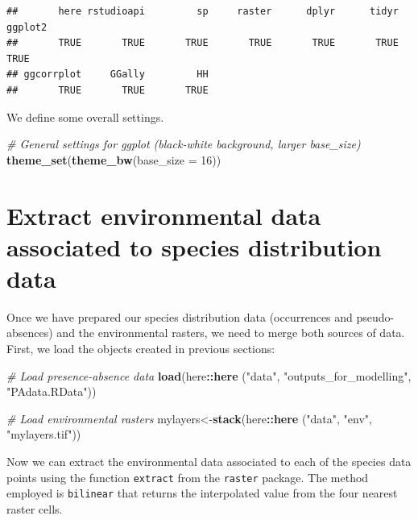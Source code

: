 \documentclass[
]{book}
\newenvironment{Shaded}{\begin{snugshade}}{\end{snugshade}}
\newcommand{\AttributeTok}[1]{\textcolor[rgb]{0.13,0.29,0.53}{#1}}
\newcommand{\CommentTok}[1]{\textcolor[rgb]{0.56,0.35,0.01}{\textit{#1}}}
\newcommand{\DecValTok}[1]{\textcolor[rgb]{0.00,0.00,0.81}{#1}}
\newcommand{\FunctionTok}[1]{\textcolor[rgb]{0.13,0.29,0.53}{\textbf{#1}}}
\newcommand{\NormalTok}[1]{#1}
\newcommand{\OtherTok}[1]{\textcolor[rgb]{0.56,0.35,0.01}{#1}}
\newcommand{\SpecialCharTok}[1]{\textcolor[rgb]{0.81,0.36,0.00}{\textbf{#1}}}
\newcommand{\StringTok}[1]{\textcolor[rgb]{0.31,0.60,0.02}{#1}}
\begin{document}
\begin{verbatim}
##       here rstudioapi         sp     raster      dplyr      tidyr    ggplot2 
##       TRUE       TRUE       TRUE       TRUE       TRUE       TRUE       TRUE 
## ggcorrplot     GGally         HH 
##       TRUE       TRUE       TRUE
\end{verbatim}

We define some overall settings.

\begin{Shaded}
\begin{Highlighting}[]
\CommentTok{\# General settings for ggplot (black{-}white background, larger base\_size)}
\FunctionTok{theme\_set}\NormalTok{(}\FunctionTok{theme\_bw}\NormalTok{(}\AttributeTok{base\_size =} \DecValTok{16}\NormalTok{))}
\end{Highlighting}
\end{Shaded}

\section{Extract environmental data associated to species distribution data}\label{extract-environmental-data-associated-to-species-distribution-data}

Once we have prepared our species distribution data (occurrences and pseudo-absences) and the environmental rasters, we need to merge both sources of data. First, we load the objects created in previous sections:

\begin{Shaded}
\begin{Highlighting}[]
\CommentTok{\# Load presence{-}absence data}
\FunctionTok{load}\NormalTok{(here}\SpecialCharTok{::}\FunctionTok{here}\NormalTok{ (}\StringTok{"data"}\NormalTok{, }\StringTok{"outputs\_for\_modelling"}\NormalTok{, }\StringTok{"PAdata.RData"}\NormalTok{))}

\CommentTok{\# Load environmental rasters}
\NormalTok{mylayers}\OtherTok{\textless{}{-}}\FunctionTok{stack}\NormalTok{(here}\SpecialCharTok{::}\FunctionTok{here}\NormalTok{ (}\StringTok{"data"}\NormalTok{, }\StringTok{"env"}\NormalTok{, }\StringTok{"mylayers.tif"}\NormalTok{))}
\end{Highlighting}
\end{Shaded}

Now we can extract the environmental data associated to each of the species data points using the function \texttt{extract} from the \texttt{raster} package. The method employed is \texttt{bilinear} that returns the interpolated value from the four nearest raster cells.
\end{document}
